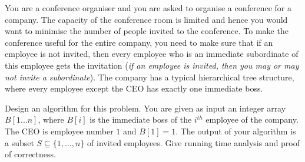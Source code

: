 \documentclass{exam}
\begin{document}
\begin{questions}



\vspace{0.4in}

\question[25] You are a conference organiser and you are asked to organise a conference for a company. 
The capacity of the conference room is limited and hence you would want to minimise the number of people invited to the conference.
To make the conference useful for the entire company, you need to make sure that if an employee is not invited, then every employee who is an immediate subordinate of this employee gets the invitation
({\it if an employee is invited, then you may or may not invite a subordinate}).
The company has a typical hierarchical tree structure, where every employee except the CEO has exactly one immediate boss.

Design an algorithm for this problem. You are given as input an integer array $B[1...n]$, where $B[i]$ is the immediate boss of the $i^{th}$ employee of the company. The CEO is employee number $1$ and $B[1]=1$. The output of your algorithm is a subset $S \subseteq \{1, ..., n\}$ of invited employees. 
Give running time analysis and proof of correctness.


\end{questions}
\end{document}

